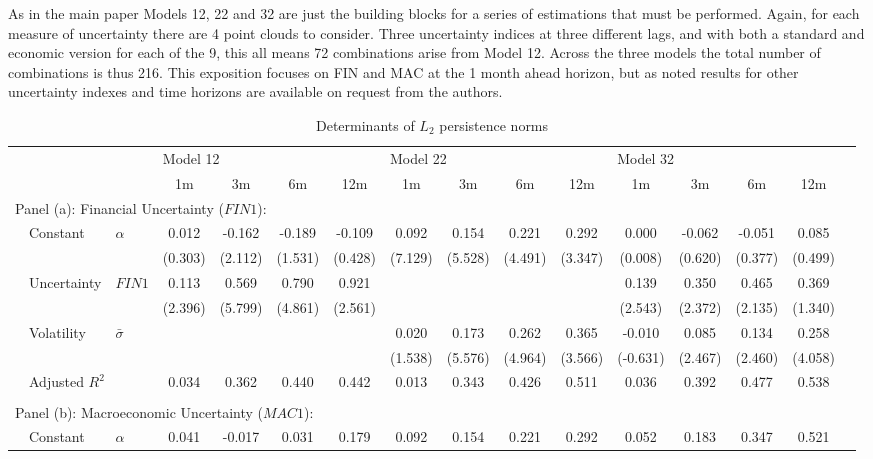 \documentclass{article}
\begin{document}
As in the main paper Models 12, 22 and 32 are just the building blocks for a series of estimations that must be performed. Again, for each measure of uncertainty there are 4 point clouds to consider. Three uncertainty indices at three different lags, and with both a standard and economic version for each of the 9, this all means 72 combinations arise from Model 12. Across the three models the total number of combinations is thus 216. This exposition focuses on FIN and MAC at the 1 month ahead horizon, but as noted results for other uncertainty indexes and time horizons are available on request from the authors.

\begin{sidewaystable}
    \begin{center}
        \caption{Determinants of $L_2$ persistence norms}
        \label{tab:reg12}
        \begin{tabular}{ll l c c c c c c c c c c c c c}
        \hline
             &&& \multicolumn{4}{l}{Model 12} & \multicolumn{4}{l}{Model 22}& \multicolumn{4}{l}{Model 32}\\
             &&& 1m & 3m & 6m & 12m & 1m & 3m & 6m & 12m & 1m & 3m & 6m & 12m\\
             \hline
             \multicolumn{12}{l}{Panel (a): Financial Uncertainty ($FIN1$): }\\
             & Constant & $\alpha$ & 0.012&-0.162&-0.189&-0.109&0.092&0.154&0.221&0.292&0.000&-0.062&-0.051&0.085\\
			&&&(0.303)&(2.112)&(1.531)&(0.428)&(7.129)&(5.528)&(4.491)&(3.347)&(0.008)&(0.620)&(0.377)&(0.499)\\
			&Uncertainty & $FIN1$&0.113&0.569&0.790&0.921&&&&&0.139&0.350&0.465&0.369\\
			&&&(2.396)&(5.799)&(4.861)&(2.561)&&&&&(2.543)&(2.372)&(2.135)&(1.340)\\
			& Volatility & $\bar{\sigma}$&&&&&0.020&0.173&0.262&0.365&-0.010&0.085&0.134&0.258\\
			&&&&&&&(1.538)&(5.576)&(4.964)&(3.566)&(-0.631)&(2.467)&(2.460)&(4.058)\\
			&\multicolumn{2}{l}{Adjusted $R^2$}&0.034&0.362&0.440&0.442&0.013&0.343&0.426&0.511&0.036&0.392&0.477&0.538\\
            &&&&&&\\
             \multicolumn{9}{l}{Panel (b): Macroeconomic Uncertainty ($MAC1$): }\\
             & Constant & $\alpha$ & 0.041&-0.017&0.031&0.179&0.092&0.154&0.221&0.292&0.052&0.183&0.347&0.521\\

\end{tabular}
\end{center}
\end{sidewaystable}
\end{document}
